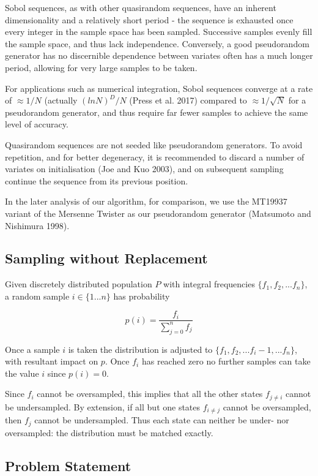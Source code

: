 \documentclass[]{article}
\begin{document}
Sobol sequences, as with other quasirandom sequences, have an inherent
dimensionality and a relatively short period - the sequence is exhausted
once every integer in the sample space has been sampled. Successive
samples evenly fill the sample space, and thus lack independence.
Conversely, a good pseudorandom generator has no discernible dependence
between variates often has a much longer period, allowing for very large
samples to be taken.

For applications such as numerical integration, Sobol sequences converge
at a rate of \(\approx1/N\) (actually \((ln N)^D/N\) (Press et al. 2017)
compared to \(\approx1/\sqrt N\) for a pseudorandom generator, and thus
require far fewer samples to achieve the same level of accuracy.

Quasirandom sequences are not seeded like pseudorandom generators. To
avoid repetition, and for better degeneracy, it is recommended to
discard a number of variates on initialisation (Joe and Kuo 2003), and
on subsequent sampling continue the sequence from its previous position.

In the later analysis of our algorithm, for comparison, we use the
MT19937 variant of the Mersenne Twister as our pseudorandom generator
(Matsumoto and Nishimura 1998).

\subsection{Sampling without
Replacement}\label{sampling-without-replacement}

Given discretely distributed population \(P\) with integral frequencies
\(\{f_1,f_2,...f_n\}\), a random sample \(i \in \{1...n\}\) has
probability

\[p(i) = \frac{f_i}{\sum\limits_{j=0}^{n}f_j}\]

Once a sample \(i\) is taken the distribution is adjusted to
\(\{f_1,f_2,...f_i-1,...f_n\}\), with resultant impact on \(p\). Once
\(f_i\) has reached zero no further samples can take the value \(i\)
since \(p(i) = 0\).

Since \(f_i\) cannot be oversampled, this implies that all the other
states \(f_{j\neq{i}}\) cannot be undersampled. By extension, if all but
one states \(f_{i\neq{j}}\) cannot be oversampled, then \(f_j\) cannot
be undersampled. Thus each state can neither be under- nor oversampled:
the distribution must be matched exactly.

\subsection{Problem Statement}\label{problem-statement}
\end{document}
